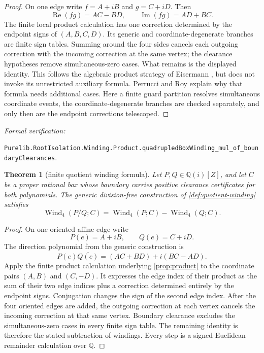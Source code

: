 \documentclass[11pt]{article}
\newtheorem{theorem}{Theorem}[section]
\newcommand{\Qi}{\mathbb{Q}(i)}
\newcommand{\Q}{\mathbb{Q}}
\newcommand{\Ree}{\operatorname{Re}}
\newcommand{\Imm}{\operatorname{Im}}
\newcommand{\Wind}{\operatorname{Wind}}
\newcommand{\leanref}[1]{\par\smallskip\noindent
  \emph{Formal verification:}\par\nobreak
  {\raggedright\nolinkurl{#1}.\par}}
\begin{document}
\begin{proof}
On one edge write $f=A+iB$ and $g=C+iD$.  Then
\[
 \Ree(fg)=AC-BD,\qquad \Imm(fg)=AD+BC.
\]
The finite local product calculation has one correction determined by the
endpoint signs of $(A,B,C,D)$.  Its generic and coordinate-degenerate
branches are finite sign tables.  Summing around the four sides cancels each
outgoing correction with the incoming correction at the same vertex; the
clearance hypotheses remove simultaneous-zero cases.  What remains is the
displayed identity.  This follows the algebraic product strategy of
Eisermann \cite{Eisermann}, but does not invoke its unrestricted auxiliary
formula.  Perrucci and Roy \cite{PerrucciRoyWinding} explain why that formula
needs additional cases.  Here a finite guard partition resolves simultaneous
coordinate events, the coordinate-degenerate branches are checked
separately, and only then are the endpoint corrections telescoped.
\end{proof}

\leanref{Purelib.RootIsolation.Winding.Product.quadrupledBoxWinding_mul_of_boundaryClearances}

\begin{theorem}[finite quotient winding formula]
\label{thm:rfap-quotient}
Let $P,Q\in\Qi[Z]$, and let $C$ be a proper rational box whose boundary
carries positive clearance certificates for both polynomials.  The generic
division-free construction of \cref{def:quotient-winding} satisfies
\[
       \Wind_4(P/Q;C)=\Wind_4(P;C)-\Wind_4(Q;C).
\]
\end{theorem}

\begin{proof}
On one oriented affine edge write
\[
 P(e)=A+iB,
 \qquad
 Q(e)=C+iD.
\]
The direction polynomial from the generic construction is
\[
 P(e)\overline{Q(e)}=(AC+BD)+i(BC-AD).
\]
Apply the finite product calculation underlying
\cref{prop:product} to the coordinate pairs $(A,B)$ and $(C,-D)$.
It expresses the edge index of their product as the sum of their two edge
indices plus a correction determined entirely by the endpoint signs.
Conjugation changes the sign of the second edge index.  After the four
oriented edges are added, the outgoing correction at each vertex cancels
the incoming correction at that same vertex.  Boundary clearance excludes
the simultaneous-zero cases in every finite sign table.  The remaining
identity is therefore the stated subtraction of windings.  Every step is a
signed Euclidean-remainder calculation over $\Q$.
\end{proof}
\end{document}
